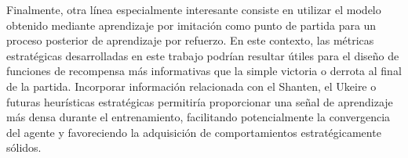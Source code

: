 Finalmente, otra línea especialmente interesante consiste en utilizar el modelo obtenido mediante aprendizaje por imitación como punto de partida para un proceso posterior de aprendizaje por refuerzo. En este contexto, las métricas estratégicas desarrolladas en este trabajo podrían resultar útiles para el diseño de funciones de recompensa más informativas que la simple victoria o derrota al final de la partida. Incorporar información relacionada con el Shanten, el Ukeire o futuras heurísticas estratégicas permitiría proporcionar una señal de aprendizaje más densa durante el entrenamiento, facilitando potencialmente la convergencia del agente y favoreciendo la adquisición de comportamientos estratégicamente sólidos.
